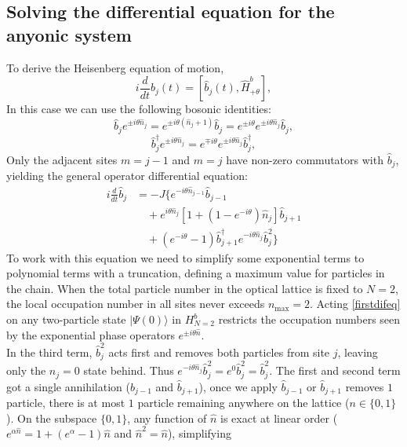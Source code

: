 \subsection{Solving the differential equation for the anyonic system} \label{subsubDifForAny}
To derive the Heisenberg equation of motion, 
\begin{equation} 
i\frac{d}{dt}\hat{b}_j(t) = [\hat{b}_j(t), \hat{H}^b_{+\theta} ],
\end{equation}  
In this case we can use the following bosonic identities: 
\begin{equation} 
\hat{b}_j e^{\pm i\theta \hat{n}_j} = e^{\pm i\theta(\hat{n}_j + 1)} \hat{b}_j = e^{\pm i\theta} e^{\pm i\theta \hat{n}_j} \hat{b}_j,
\end{equation} 
\begin{equation} 
\hat{b}_j^\dagger e^{\pm i\theta \hat{n}_j} = e^{\mp i\theta} e^{\pm i\theta \hat{n}_j} \hat{b}_j^\dagger,
\end{equation} 
Only the adjacent sites $m = j-1$ and $m = j$ have non-zero commutators with $\hat{b}_j$, yielding the general operator differential equation:
\begin{equation}\label{firstdifeq}
\begin{split}
\textit{i} \frac{d}{dt}\hat{b}_j &= -J \Bigr\{ e^{-i\theta \hat{n}_{j-1}} \hat{b}_{j-1}  \\
&\quad + e^{i\theta \hat{n}_j} \left[ 1 + \left(1 - e^{-i\theta}\right)\hat{n}_j \right] \hat{b}_{j+1}  \\
&\quad + \left(e^{-i\theta} - 1\right) \hat{b}_{j+1}^\dagger e^{-i\theta \hat{n}_j} \hat{b}_j^2 \Bigr\}
\end{split}
\end{equation}
To work with this equation we need to simplify some exponential terms to polynomial terms with a truncation, defining a maximum value for particles in the chain. When the total particle number in the optical lattice is fixed to $N = 2$, the local occupation number in all sites never exceeds $n_{\max} = 2$. Acting \eqref{firstdifeq} on any two-particle state $\vert{}\Psi(0)\rangle $ in $H^b_{N=2}$ restricts the occupation numbers seen by the exponential phase operators $e^{\pm i\theta \hat{n}}$. \\
In the third term, $\hat{b}_j^2$ acts first and removes both particles from site $j$, leaving only the $n_j = 0$ state behind. Thus $e^{-i\theta \hat{n}_j} \hat{b}_j^2 = e^0 \hat{b}_j^2 = \hat{b}_j^2$.
The first and second term got a single annihilation ($\hat{b}_{j-1}$ and $\hat{b}_{j+1}$), once we apply $\hat{b}_{j-1}$ or $\hat{b}_{j+1}$ removes $1$ particle, there is at most $1$ particle remaining anywhere on the lattice ($n \in \{0, 1\}$). On the subspace $\{0, 1\}$, any function of $\hat{n}$ is exact at linear order ($e^{\alpha \hat{n}} = 1 + (e^\alpha - 1)\hat{n}$ and $\hat{n}^2 = \hat{n}$), simplifying 
